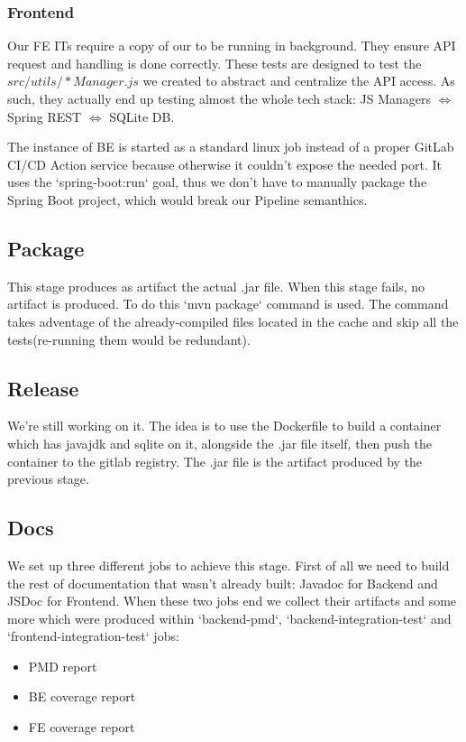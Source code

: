 \documentclass[a4paper,10pt]{scrartcl}
\begin{document}
\subsubsection{Frontend}

Our FE ITs require a copy of our to be running in background. They ensure API request and handling is done correctly. These tests are designed to test the $src/utils/*Manager.js$ we created to abstract and centralize the API access. As such, they actually end up testing almost the whole tech stack: JS Managers $\Leftrightarrow$ Spring REST $\Leftrightarrow$ SQLite DB.

The instance of BE is started as a standard linux job instead of a proper GitLab CI/CD Action service because otherwise it couldn't expose the needed port. It uses the `spring-boot:run` goal, thus we don't have to manually package the Spring Boot project, which would break our Pipeline semanthics.

\subsection{Package}

This stage produces as artifact the actual .jar file. When this stage fails, no artifact is produced.
To do this `mvn package` command is used. The command takes adventage of the already-compiled files located in the cache and skip all the tests(re-running them would be redundant).

\subsection{Release}

We're still working on it.
The idea is to use the Dockerfile to build a container which has javajdk and sqlite on it, alongside the .jar file itself, then push the container to the gitlab registry. The .jar file is the artifact produced by the previous stage.

\subsection{Docs}

We set up three different jobs to achieve this stage. First of all we need to build the rest of documentation that wasn't already built: Javadoc for Backend and JSDoc for Frontend. When these two jobs end we collect their artifacts and some more which were produced within `backend-pmd`, `backend-integration-test` and `frontend-integration-test` jobs:
\begin{itemize}
    \item PMD report
    \item BE coverage report
    \item FE coverage report
\end{itemize}
\end{document}
